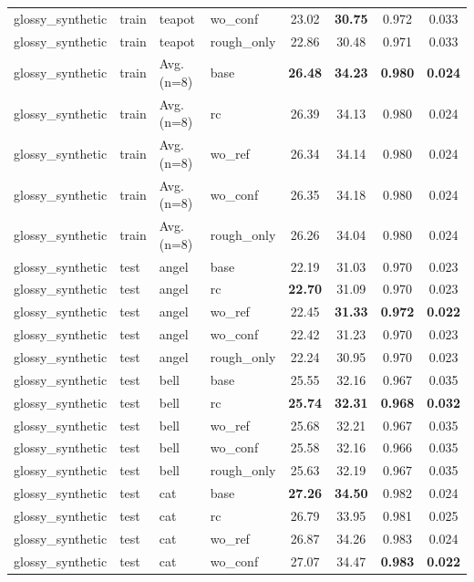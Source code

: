 \begin{table}[t]
{\begin{tabular}{llllcccc}
glossy\_synthetic & train & teapot & wo\_conf & 23.02 & \textbf{30.75} & 0.972 & 0.033 \\
glossy\_synthetic & train & teapot & rough\_only & 22.86 & 30.48 & 0.971 & 0.033 \\
glossy\_synthetic & train & Avg. (n=8) & base & \textbf{26.48} & \textbf{34.23} & \textbf{0.980} & \textbf{0.024} \\
glossy\_synthetic & train & Avg. (n=8) & rc & 26.39 & 34.13 & 0.980 & 0.024 \\
glossy\_synthetic & train & Avg. (n=8) & wo\_ref & 26.34 & 34.14 & 0.980 & 0.024 \\
glossy\_synthetic & train & Avg. (n=8) & wo\_conf & 26.35 & 34.18 & 0.980 & 0.024 \\
glossy\_synthetic & train & Avg. (n=8) & rough\_only & 26.26 & 34.04 & 0.980 & 0.024 \\
\midrule
glossy\_synthetic & test & angel & base & 22.19 & 31.03 & 0.970 & 0.023 \\
glossy\_synthetic & test & angel & rc & \textbf{22.70} & 31.09 & 0.970 & 0.023 \\
glossy\_synthetic & test & angel & wo\_ref & 22.45 & \textbf{31.33} & \textbf{0.972} & \textbf{0.022} \\
glossy\_synthetic & test & angel & wo\_conf & 22.42 & 31.23 & 0.970 & 0.023 \\
glossy\_synthetic & test & angel & rough\_only & 22.24 & 30.95 & 0.970 & 0.023 \\
glossy\_synthetic & test & bell & base & 25.55 & 32.16 & 0.967 & 0.035 \\
glossy\_synthetic & test & bell & rc & \textbf{25.74} & \textbf{32.31} & \textbf{0.968} & \textbf{0.032} \\
glossy\_synthetic & test & bell & wo\_ref & 25.68 & 32.21 & 0.967 & 0.035 \\
glossy\_synthetic & test & bell & wo\_conf & 25.58 & 32.16 & 0.966 & 0.035 \\
glossy\_synthetic & test & bell & rough\_only & 25.63 & 32.19 & 0.967 & 0.035 \\
glossy\_synthetic & test & cat & base & \textbf{27.26} & \textbf{34.50} & 0.982 & 0.024 \\
glossy\_synthetic & test & cat & rc & 26.79 & 33.95 & 0.981 & 0.025 \\
glossy\_synthetic & test & cat & wo\_ref & 26.87 & 34.26 & 0.983 & 0.024 \\
glossy\_synthetic & test & cat & wo\_conf & 27.07 & 34.47 & \textbf{0.983} & \textbf{0.022} \\

\end{tabular}}
\end{table}
